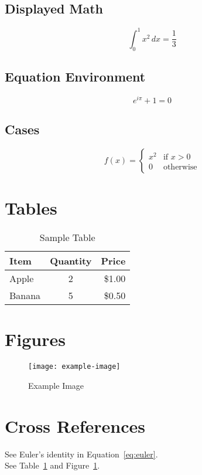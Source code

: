 \documentclass[12pt,a4paper]{article}
\begin{document}
\subsection{Displayed Math}
\[
\int_0^1 x^2\,dx = \frac{1}{3}
\]

\subsection{Equation Environment}
\begin{equation}
e^{i\pi} + 1 = 0
\label{eq:euler}
\end{equation}

\subsection{Cases}
\[
f(x) = \begin{cases}
x^2 & \text{if } x > 0 \\
0   & \text{otherwise}
\end{cases}
\]

\section{Tables}
\begin{table}[h!]
\centering
\caption{Sample Table}
\begin{tabular}{lcr}
\toprule
Item & Quantity & Price \\
\midrule
Apple & 2 & \$1.00 \\
Banana & 5 & \$0.50 \\
\bottomrule
\end{tabular}
\label{tab:fruits}
\end{table}

\section{Figures}
\begin{figure}[h!]
\centering
\texttt{[image: example-image]} %
\caption{Example Image}
\label{fig:sample}
\end{figure}

\section{Cross References}
See Euler’s identity in Equation~\ref{eq:euler}. \\
See Table~\ref{tab:fruits} and Figure~\ref{fig:sample}.
\end{document}
